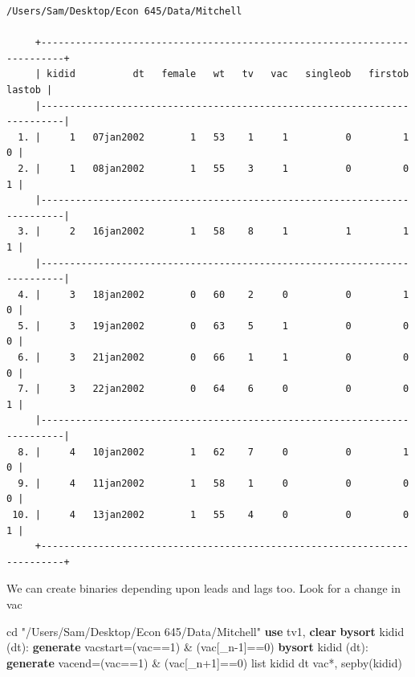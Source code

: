 \documentclass[
]{book}
\newenvironment{Shaded}{\begin{snugshade}}{\end{snugshade}}
\newcommand{\DataTypeTok}[1]{\textcolor[rgb]{0.13,0.29,0.53}{#1}}
\newcommand{\KeywordTok}[1]{\textcolor[rgb]{0.13,0.29,0.53}{\textbf{#1}}}
\newcommand{\NormalTok}[1]{#1}
\newcommand{\OtherTok}[1]{\textcolor[rgb]{0.56,0.35,0.01}{#1}}
\newcommand{\StringTok}[1]{\textcolor[rgb]{0.31,0.60,0.02}{#1}}
\begin{document}
\begin{verbatim}
/Users/Sam/Desktop/Econ 645/Data/Mitchell

     +--------------------------------------------------------------------------+
     | kidid          dt   female   wt   tv   vac   singleob   firstob   lastob |
     |--------------------------------------------------------------------------|
  1. |     1   07jan2002        1   53    1     1          0         1        0 |
  2. |     1   08jan2002        1   55    3     1          0         0        1 |
     |--------------------------------------------------------------------------|
  3. |     2   16jan2002        1   58    8     1          1         1        1 |
     |--------------------------------------------------------------------------|
  4. |     3   18jan2002        0   60    2     0          0         1        0 |
  5. |     3   19jan2002        0   63    5     1          0         0        0 |
  6. |     3   21jan2002        0   66    1     1          0         0        0 |
  7. |     3   22jan2002        0   64    6     0          0         0        1 |
     |--------------------------------------------------------------------------|
  8. |     4   10jan2002        1   62    7     0          0         1        0 |
  9. |     4   11jan2002        1   58    1     0          0         0        0 |
 10. |     4   13jan2002        1   55    4     0          0         0        1 |
     +--------------------------------------------------------------------------+
\end{verbatim}

We can create binaries depending upon leads and lags too.
Look for a change in vac

\begin{Shaded}
\begin{Highlighting}[]
\NormalTok{cd }\StringTok{"/Users/Sam/Desktop/Econ 645/Data/Mitchell"}
\KeywordTok{use}\NormalTok{ tv1, }\KeywordTok{clear}
\KeywordTok{bysort}\NormalTok{ kidid (dt): }\KeywordTok{generate}\NormalTok{ vacstart=(vac==1) \& (vac[}\DataTypeTok{\_n}\NormalTok{{-}1]==0)}
\KeywordTok{bysort}\NormalTok{ kidid (dt): }\KeywordTok{generate}\NormalTok{ vacend=(vac==1) \& (vac[}\DataTypeTok{\_n}\NormalTok{+1]==0)}
\OtherTok{list}\NormalTok{ kidid dt vac*, sepby(kidid)}
\end{Highlighting}
\end{Shaded}
\end{document}
